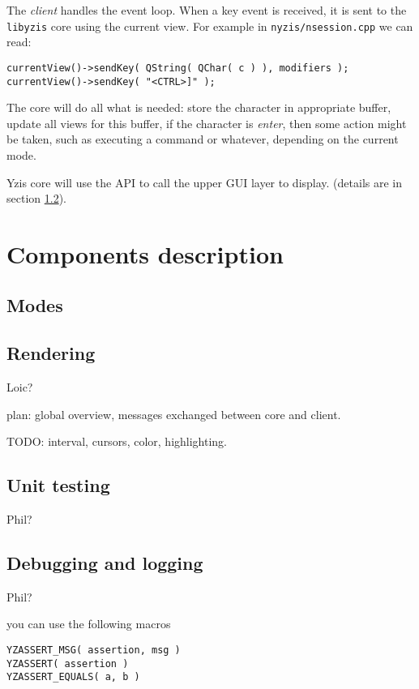 \documentclass[a4paper,12pt]{report}
\begin{document}
The \emph{client} handles the event loop. When a key event is received, it is sent
to the \verb+libyzis+ core using the current view. For example in
\verb+nyzis/nsession.cpp+ we can read:
\begin{verbatim}
currentView()->sendKey( QString( QChar( c ) ), modifiers );
currentView()->sendKey( "<CTRL>]" );
\end{verbatim}

The core will do all what is needed: store the character in appropriate
buffer, update all views for this buffer, if the character is \emph{enter},
then some action might be taken, such as executing a command or whatever,
depending on the current mode.

Yzis core will use the API to call the upper GUI layer to display. (details
are in section \ref{rendering}).



\chapter{Components description}

\section{Modes}


\section{Rendering}
\label{rendering}

Loic?

plan: global overview, messages exchanged between core and client.

TODO: interval, cursors, color, highlighting.

\section{Unit testing}

Phil?

\section{Debugging and logging}

Phil?

you can use the following macros
\begin{verbatim}
YZASSERT_MSG( assertion, msg )
YZASSERT( assertion )
YZASSERT_EQUALS( a, b )
\end{verbatim}
\end{document}
